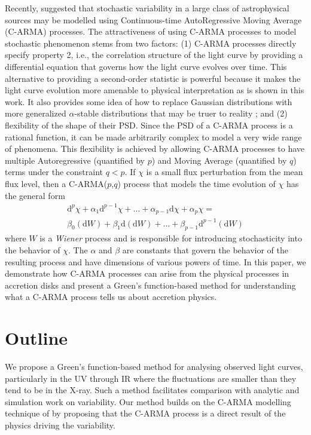 \documentclass[a4paper,fleqn,usenatbib]{mnras}
\begin{document}
Recently, \citet{Kelly14} suggested that stochastic variability in a large class of astrophysical sources may be modelled using Continuous-time AutoRegressive Moving Average (C-ARMA) processes. The attractiveness of using C-ARMA processes to model stochastic phenomenon stems from two factors: (1) C-ARMA processes directly specify property 2, i.e., the correlation structure of the light curve by providing a differential equation that governs how the light curve evolves over time. This alternative to providing a second-order statistic is powerful because it makes the light curve evolution more amenable to physical interpretation as is shown in this work. It also provides some idea of how to replace Gaussian distributions with more generalized $\alpha$-stable distributions that may be truer to reality \citep{BrockwellMarquardt05, BrockwellLinder09}; and (2) flexibility of the shape of their PSD. Since the PSD of a C-ARMA process is a rational function, it can be made arbitrarily complex to model a very wide range of phenomena. This flexibility is achieved by allowing C-ARMA processes to have multiple Autoregressive (quantified by $p$) and Moving Average (quantified by $q$) terms under the constraint $q < p$. If $\chi$ is a small flux perturbation from the mean flux level, then a C-ARMA($p$,$q$) process that models the time evolution of $\chi$ has the general form
\begin{multline}\label{eq:CARMAIntro}
\mathrm{d}^{p}\chi + \alpha_{1} \mathrm{d}^{p-1}\chi + \ldots + \alpha_{p-1} \mathrm{d}\chi + \alpha_{p} \chi = \\ \beta_{0} (\mathrm{d}W) + \beta_{1} \mathrm{d}(\mathrm{d}W) + \ldots + \beta_{p-1} \mathrm{d}^{p-1}(\mathrm{d}W)
\end{multline}
where $W$ is a \textit{Wiener} process and is responsible for introducing stochasticity into the behavior of $\chi$. The $\alpha$ and $\beta$ are constants that govern the behavior of the resulting process and have dimensions of various powers of time. In this paper, we demonstrate how C-ARMA processes can arise from the physical processes in accretion disks and present a Green's function-based method for understanding what a C-ARMA process tells us about accretion physics.

\section[Outline]{Outline}\label{sec:Outline}

We propose a Green's function-based method for analysing observed light curves, particularly in the UV through IR where the fluctuations are smaller than they tend to be in the X-ray. Such a method facilitates comparison with analytic and simulation work on variability. Our method builds on the C-ARMA modelling technique of \citet{Kelly14} by proposing that the C-ARMA process is a direct result of the physics driving the variability. 
\end{document}
